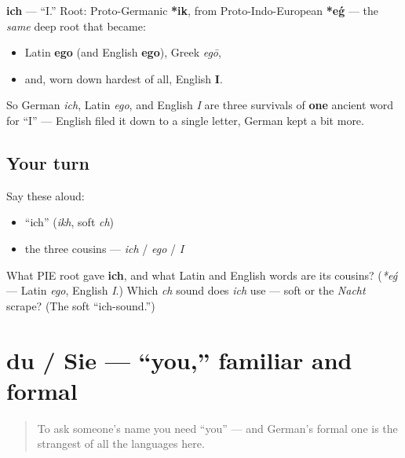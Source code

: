 \begin{cousinweb}
\textbf{ich} — \textquotedblleft{}I.\textquotedblright{} Root: Proto-Germanic \textbf{*ik}, from Proto-Indo-European \textbf{*eǵ} — the \emph{same} deep root that became:

\begin{itemize}
\raggedright
  \item Latin \textbf{ego} (and English \textbf{ego}), Greek \emph{egō},
  \item and, worn down hardest of all, English \textbf{I}.
\end{itemize}

So German \emph{ich}, Latin \emph{ego}, and English \emph{I} are three survivals of \textbf{one} ancient word for \textquotedblleft{}I\textquotedblright{} — English filed it down to a single letter, German kept a bit more.
\end{cousinweb}

\subsection*{Your turn}
Say these aloud:

\begin{itemize}
\raggedright
  \item \textquotedblleft{}ich\textquotedblright{} (\emph{ikh}, soft \emph{ch})
  \item the three cousins — \emph{ich} / \emph{ego} / \emph{I}
\end{itemize}

\begin{tcolorbox}[breakable,colback=teal!4,colframe=teal!35!black,title={Before you move on}]
What PIE root gave \textbf{ich}, and what Latin and English words are its cousins? (\emph{*eǵ} — Latin \emph{ego}, English \emph{I}.) Which \emph{ch} sound does \emph{ich} use — soft or the \emph{Nacht} scrape? (The soft \textquotedblleft{}ich-sound.\textquotedblright{})
\end{tcolorbox}
\section[du / Sie]{du / Sie — \textquotedblleft{}you,\textquotedblright{} familiar and formal}

\label{lesson:GE-C02-du-sie}



\begin{quote}
To ask someone's name you need \textquotedblleft{}you\textquotedblright{} — and German's formal one is the strangest of all the languages here.
\end{quote}

